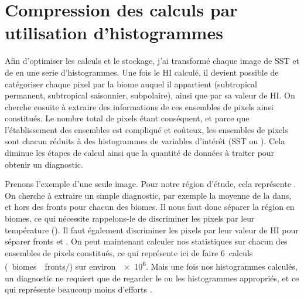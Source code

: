 \begin{figure}
  \centering
  \label{fig:exemples-fronts}
\end{figure}


\section{Compression des calculs par utilisation d'histogrammes}
\label{sec:extraction-hist}

Afin d'optimiser les calculs et le stockage, j'ai transformé chaque image  de SST et de  en une serie d'histogrammes.
Une fois le HI calculé, il devient possible de catégoriser chaque pixel par la biome auquel il appartient (subtropical permanent, subtropical saisonnier, subpolaire), ainsi que par sa valeur de HI.
On cherche ensuite à extraire des informations de ces ensembles de pixels ainsi constitués.
Le nombre total de pixels étant conséquent, et parce que l'établissement des ensembles est compliqué et coûteux, les ensembles de pixels sont chacun réduits à des histogrammes de variables d'intérêt (SST ou ).
Cela diminue les étapes de calcul ainsi que la quantité de données à traiter pour obtenir un diagnostic.

Prenons l'exemple d'une seule image. Pour notre région d'étude, cela représente .
On cherche à extraire un simple diagnostic, par exemple la moyenne de la  dans, et hors des fronts pour chacun des biomes.
Il nous faut donc séparer la région en biomes, ce qui nécessite rappelons-le de discriminer les pixels par leur température ().
Il faut également discriminer les pixels par leur valeur de HI pour séparer fronts et .
On peut maintenant calculer nos statistiques sur chacun des ensembles de pixels constitués, ce qui représente ici de faire 6~calculs (~biomes~\texttimes\ fronts/) sur environ~\qty{e6}{\pixels}.
Mais une fois nos histogrammes calculés, un diagnostic ne requiert que de regarder le ou les histogrammes appropriés, et ce qui représente beaucoup moins d'efforts .

